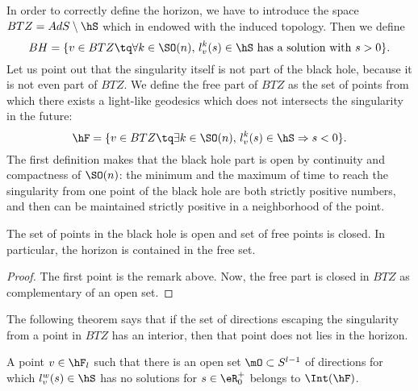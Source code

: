 	In order to correctly define the horizon, we have to introduce the space $BTZ=AdS\setminus\hS$ which in endowed with the induced topology. Then we define
	\begin{equation}
		BH=\{ v\in BTZ\tq\forall k\in \SO(n),\, l_v^k(s)\in\hS\text{ has a solution with }s>0 \}.
	\end{equation}
	Let us point out that the singularity itself is not part of the black hole, because it is not even part of $BTZ$. We define the free part of $BTZ$ as the set of points from which there exists a light-like geodesics which does not intersects the singularity in the future:
	\begin{equation}
		\hF=\{ v\in BTZ\tq\exists k\in \SO(n),\, l_v^k(s)\in\hS\Rightarrow s<0 \}.
	\end{equation}
	The first definition makes that the black hole part is open by continuity and compactness of $\SO(n)$: the minimum and the maximum of time to reach the singularity from one point of the black hole are both strictly positive numbers, and then can be maintained strictly positive in a neighborhood of the point.

	\begin{proposition}		\label{PropBHouvertLibreFerme}
		The set of points in the black hole is open and set of free points is closed. In particular, the horizon is contained in the free set.
	\end{proposition}

	\begin{proof}
		The first point is the remark above. Now, the free part is closed in $BTZ$ as complementary of an open set.
	\end{proof}

	The following theorem says that if the set of directions escaping the singularity from a point in $BTZ$ has an interior, then that point does not lies in the horizon.
	\begin{proposition}		\label{PropvFOsvghorvec}
		A point $v\in\hF_l$ such that there is an open set $\mO\subset S^{l-1}$ of directions for which $l^{w}_v(s)\in\hS$ has no solutions for $s\in\eR^+_0$ belongs to $\Int(\hF)$.
	\end{proposition}


